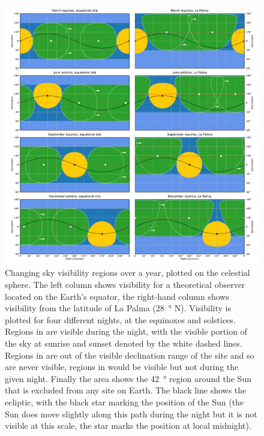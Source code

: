 \begin{colsection}
\begin{colsection}
\begin{figure}[p]
    \begin{center}
        \includegraphics[width=\linewidth]{images/visibility.pdf}
    \end{center}
    \caption[Plotting sky visibility regions over a year]{
        Changing sky visibility regions over a year, plotted on the celestial sphere. The left column shows visibility for a theoretical observer located on the Earth's equator, the right-hand column shows visibility from the latitude of La Palma (\SI{28}{\degree} N). Visibility is plotted for four different nights, at the equinoxes and solstices. Regions in  are visible during the night, with the visible portion of the sky at sunrise and sunset denoted by the white dashed lines. Regions in  are out of the visible declination range of the site and so are never visible, regions in  would be visible but not during the given night. Finally the  area shows the \SI{42}{\degree} region around the Sun that is excluded from any site on Earth. The black line shows the ecliptic, with the black star marking the position of the Sun (the Sun does move slightly along this path during the night but it is not visible at this scale, the star marks the position at local midnight).
    }\label{fig:visibility}
\end{figure}


\end{colsection}
\end{colsection}
